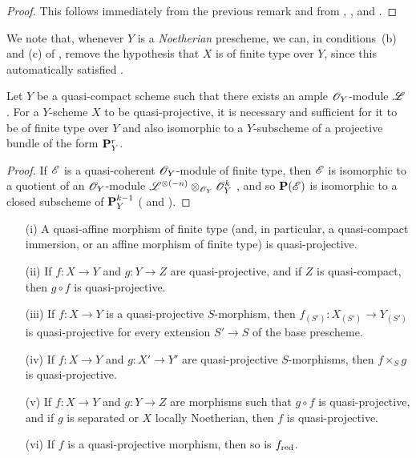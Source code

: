 \begin{proof}
This follows immediately from the previous remark and from , , and .
\end{proof}

We note that, whenever $Y$ is a \emph{Noetherian} prescheme, we can, in conditions~(b) and (c) of , remove the hypothesis that $X$ is of finite type over $Y$, since this automatically satisfied .

\begin{corollary}[5.3.3]
\label{II.5.3.3}
Let $Y$ be a quasi-compact scheme such that there exists an ample $\mathscr{O}_Y$-module $\mathscr{L}$ .
For a $Y$-scheme $X$ to be quasi-projective, it is necessary and sufficient for it to be of finite type over $Y$ and also isomorphic to a $Y$-subscheme of a projective bundle of the form $\mathbf{P}_Y^r$.
\end{corollary}

\begin{proof}
If $\mathscr{E}$ is a quasi-coherent $\mathscr{O}_Y$-module of finite type, then $\mathscr{E}$ is isomorphic to a quotient of an $\mathscr{O}_Y$-module $\mathscr{L}^{\otimes(-n)}\otimes_{\mathscr{O}_Y}\mathscr{O}_Y^k$ , and so $\mathbf{P}(\mathscr{E})$ is isomorphic to a closed subscheme of $\mathbf{P}_Y^{k-1}$ ( and ).
\end{proof}

\begin{proposition}[5.3.4]
\label{II.5.3.4}
\medskip\noindent
\begin{enumerate}
  \item[{\rm(i)}] A quasi-affine morphism of finite type (and, in particular, a quasi-compact immersion, or an affine morphism of finite type) is quasi-projective.
  \item[{\rm(ii)}] If $f:X\to Y$ and $g:Y\to Z$ are quasi-projective, and if $Z$ is quasi-compact, then $g\circ f$ is quasi-projective.
  \item[{\rm(iii)}] If $f:X\to Y$ is a quasi-projective $S$-morphism, then $f_{(S')}:X_{(S')}\to Y_{(S')}$ is quasi-projective for every extension $S'\to S$ of the base prescheme.
  \item[{\rm(iv)}] If $f:X\to Y$ and $g:X'\to Y'$ are quasi-projective $S$-morphisms, then $f\times_S g$ is quasi-projective.
  \item[{\rm(v)}] If $f:X\to Y$ and $g:Y\to Z$ are morphisms such that $g\circ f$ is quasi-projective, and if $g$ is separated or $X$ locally Noetherian, then $f$ is quasi-projective.
  \item[{\rm(vi)}] If $f$ is a quasi-projective morphism, then so is $f_{\mathrm{red}}$.
\end{enumerate}
\end{proposition}

